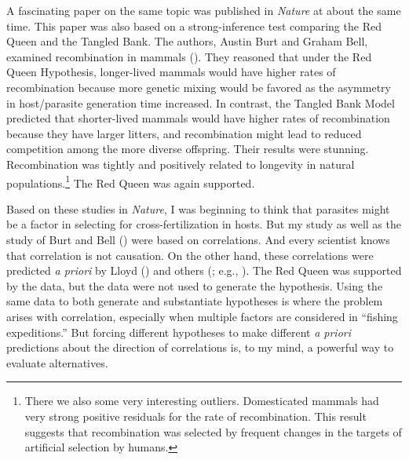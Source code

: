 \documentclass[
  letterpaper,
]{book}
\begin{document}
A fascinating paper on the same topic was published in \emph{Nature} at
about the same time. This paper was also based on a strong-inference
test comparing the Red Queen and the Tangled Bank. The authors, Austin
Burt and Graham Bell, examined recombination in mammals
(). They reasoned that under the Red Queen
Hypothesis, longer-lived mammals would have higher rates of
recombination because more genetic mixing would be favored as the
asymmetry in host/parasite generation time increased. In contrast, the
Tangled Bank Model predicted that shorter-lived mammals would have
higher rates of recombination because they have larger litters, and
recombination might lead to reduced competition among the more diverse
offspring. Their results were stunning. Recombination was tightly and
positively related to longevity in natural populations.\footnote{There
  we also some very interesting outliers. Domesticated mammals had very
  strong positive residuals for the rate of recombination. This result
  suggests that recombination was selected by frequent changes in the
  targets of artificial selection by humans.} The Red Queen was again
supported.

Based on these studies in \emph{Nature}, I was beginning to think that
parasites might be a factor in selecting for cross-fertilization in
hosts. But my study as well as the study of Burt and Bell
() were based on correlations. And every
scientist knows that correlation is not causation. On the other hand,
these correlations were predicted \emph{a priori} by Lloyd
() and others
(; e.g.,
). The Red Queen
was supported by the data, but the data were not used to generate the
hypothesis. Using the same data to both generate and substantiate
hypotheses is where the problem arises with correlation, especially when
multiple factors are considered in ``fishing expeditions.'' But forcing
different hypotheses to make different \emph{a priori} predictions about
the direction of correlations is, to my mind, a powerful way to evaluate
alternatives.
\end{document}
